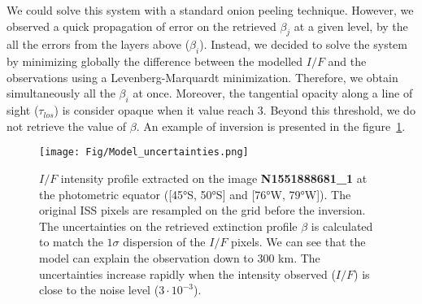 We could solve this system with a standard onion peeling technique.
However, we observed a quick propagation of error on the retrieved $\beta_j$ at a given level, by the all the errors from the
layers above ($\beta_i$).
Instead, we decided to solve the system by minimizing globally the difference between the modelled $I/F$ and the observations
using a Levenberg-Marquardt minimization. Therefore, we obtain simultaneously all the $\beta_i$ at once.
Moreover, the tangential opacity along a line of sight ($\tau_{los}$) is consider opaque when it value reach 3.
Beyond this threshold, we do not retrieve the value of $\beta$.
An example of inversion is presented in the figure~\ref{fig:model_uncertainties}.

\begin{figure}[!ht]
    \centering
    \texttt{[image: Fig/Model\_uncertainties.png]}
    \caption{$I/F$ intensity profile extracted on the image \textbf{N1551888681\_1} at the photometric
             equator ([\ang{45}S, \ang{50}S] and [\ang{76}W, \ang{79}W]). The original ISS pixels
             are resampled on the grid before the inversion. The uncertainties on the retrieved
             extinction profile $\beta$ is calculated to match the $1 \sigma$ dispersion of the
             $I/F$ pixels. We can see that the model can explain the observation down to 300 km.
             The uncertainties increase rapidly when the intensity observed ($I/F$) is close
             to the noise level ($3\cdot10^{-3}$).}
    \label{fig:model_uncertainties}
\end{figure}
